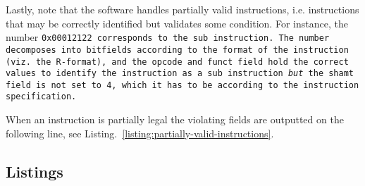 Lastly, note that the software handles partially valid instructions,
i.e. instructions that may be correctly identified but validates some
condition. For instance, the number \tt{0x00012122} corresponds to the
\tt{sub} instruction. The number decomposes into bitfields according
to the format of the instruction (viz. the R-format), and the opcode
and funct field hold the correct values to identify the instruction as
a \tt{sub} instruction \emph{but} the \tt{shamt} field is not set to
4, which it has to be according to the instruction specification.

When an instruction is partially legal the violating fields are outputted
on the following line, see Listing.~\ref{listing:partially-valid-instructions}.


\begin{landscape}
\section{Listings}


\end{landscape}
